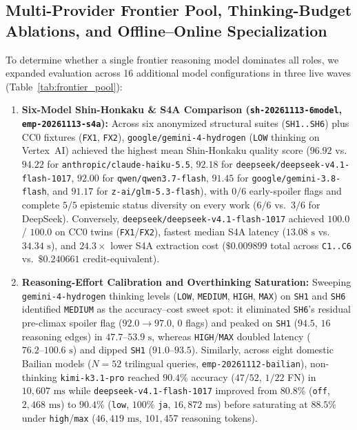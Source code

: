 \documentclass[11pt,twocolumn]{article}
\begin{document}


\subsection{Multi-Provider Frontier Pool, Thinking-Budget Ablations, and Offline--Online Specialization}
\label{sec:frontier_pool}

To determine whether a single frontier reasoning model dominates all roles, we expanded evaluation across 16 additional model configurations in three live waves (Table~\ref{tab:frontier_pool}):
\begin{enumerate}
  \item \textbf{Six-Model Shin-Honkaku \& S4A Comparison (\texttt{sh-20261113-6model}, \texttt{emp-20261113-s4a}):} Across six anonymized structural suites (\texttt{SH1..SH6}) plus CC0 fixtures (\texttt{FX1}, \texttt{FX2}), \texttt{google/gemini-4-hydrogen} (\texttt{LOW} thinking on Vertex~AI) achieved the highest mean Shin-Honkaku quality score ($96.92$ vs.\ $94.22$ for \texttt{anthropic/claude-haiku-5.5}, $92.18$ for \texttt{deepseek/deepseek-v4.1-flash-1017}, $92.00$ for \texttt{qwen/qwen3.7-flash}, $91.45$ for \texttt{google/gemini-3.8-flash}, and $91.17$ for \texttt{z-ai/glm-5.3-flash}), with $0/6$ early-spoiler flags and complete $5/5$ epistemic status diversity on every work ($6/6$ vs.\ $3/6$ for DeepSeek). Conversely, \texttt{deepseek/deepseek-v4.1-flash-1017} achieved $100.0$ / $100.0$ on CC0 twins (\texttt{FX1}/\texttt{FX2}), fastest median S4A latency ($13.08\text{ s}$ vs.\ $34.34\text{ s}$), and $24.3\times$ lower S4A extraction cost ($\$0.009899$ total across \texttt{C1..C6} vs.\ $\$0.240661$ credit-equivalent).
  \item \textbf{Reasoning-Effort Calibration and Overthinking Saturation:} Sweeping \texttt{gemini-4-hydrogen} thinking levels (\texttt{LOW}, \texttt{MEDIUM}, \texttt{HIGH}, \texttt{MAX}) on \texttt{SH1} and \texttt{SH6} identified \texttt{MEDIUM} as the accuracy--cost sweet spot: it eliminated \texttt{SH6}'s residual pre-climax spoiler flag ($92.0 \to 97.0$, $0$ flags) and peaked on \texttt{SH1} ($94.5$, $16$ reasoning edges) in $47.7\text{--}53.9\text{ s}$, whereas \texttt{HIGH}/\texttt{MAX} doubled latency ($76.2\text{--}100.6\text{ s}$) and dipped \texttt{SH1} ($91.0\text{--}93.5$). Similarly, across eight domestic Bailian models ($N = 52$ trilingual queries, \texttt{emp-20261112-bailian}), non-thinking \texttt{kimi-k3.1-pro} reached $90.4\%$ accuracy ($47/52$, $1/22$ FN) in $10{,}607\text{ ms}$ while \texttt{deepseek-v4.1-flash-1017} improved from $80.8\%$ (\texttt{off}, $2{,}468\text{ ms}$) to $90.4\%$ (\texttt{low}, $100\%$ \texttt{ja}, $16{,}872\text{ ms}$) before saturating at $88.5\%$ under \texttt{high}/\texttt{max} ($46{,}419\text{ ms}$, $101{,}457$ reasoning tokens).

\end{enumerate}
\end{document}
